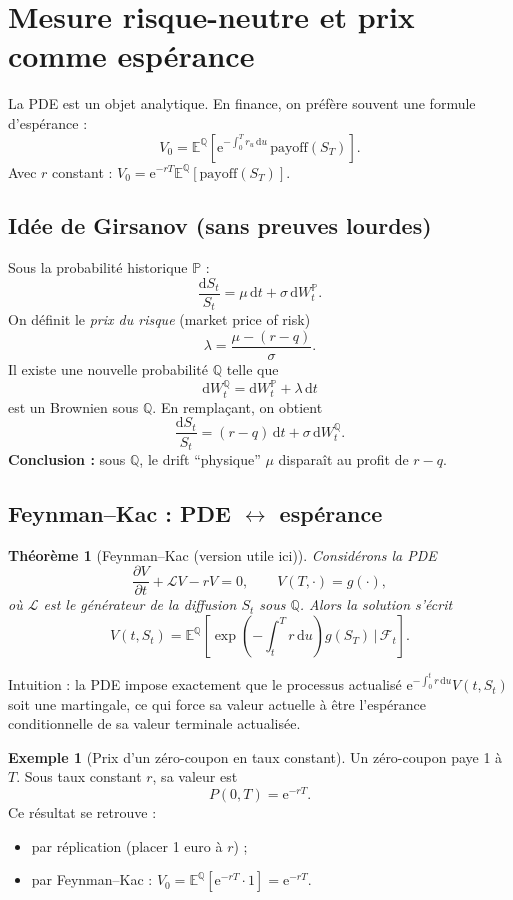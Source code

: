 \documentclass[11pt,a4paper]{report}
\newcommand{\dd}{\mathrm{d}}
\newcommand{\ee}{\mathrm{e}}
\newcommand{\E}{\mathbb{E}}
\newcommand{\Prob}{\mathbb{P}}
\newcommand{\Q}{\mathbb{Q}}
\newcommand{\1}{\mathbbm{1}}
\newcommand{\F}{\mathcal{F}}
\newcommand{\pd}[2]{\frac{\partial #1}{\partial #2}}
\theoremstyle{definition}
\newtheorem{example}{Exemple}[chapter]
\theoremstyle{plain}
\newtheorem{theorem}{Théorème}[chapter]
\theoremstyle{remark}
\begin{document}
\section{Mesure risque-neutre et prix comme espérance}
\label{sec:rn_expectation}

La PDE est un objet analytique. En finance, on préfère souvent une formule d'espérance :
\[
V_0 = \E^{\Q}\left[\ee^{-\int_0^T r_u\,\dd u}\,\text{payoff}(S_T)\right].
\]
Avec $r$ constant : $V_0=\ee^{-rT}\E^{\Q}[\text{payoff}(S_T)]$.

\subsection{Idée de Girsanov (sans preuves lourdes)}
Sous la probabilité historique $\Prob$ :
\[
\frac{\dd S_t}{S_t} = \mu\,\dd t + \sigma\,\dd W_t^{\Prob}.
\]
On définit le \emph{prix du risque} (market price of risk)
\[
\lambda = \frac{\mu-(r-q)}{\sigma}.
\]
Il existe une nouvelle probabilité $\Q$ telle que
\[
\dd W_t^{\Q} = \dd W_t^{\Prob} + \lambda\,\dd t
\]
est un Brownien sous $\Q$.
En remplaçant, on obtient
\[
\frac{\dd S_t}{S_t} = (r-q)\,\dd t + \sigma\,\dd W_t^{\Q}.
\]
\textbf{Conclusion :} sous $\Q$, le drift ``physique'' $\mu$ disparaît au profit de $r-q$.

\subsection{Feynman--Kac : PDE $\leftrightarrow$ espérance}
\begin{theorem}[Feynman--Kac (version utile ici)]
Considérons la PDE
\[
\pd{V}{t} + \mathcal{L}V - rV = 0,\qquad V(T,\cdot)=g(\cdot),
\]
où $\mathcal{L}$ est le générateur de la diffusion $S_t$ sous $\Q$.
Alors la solution s'écrit
\[
V(t,S_t) = \E^{\Q}\left[\exp\!\left(-\int_t^T r\,\dd u\right) g(S_T)\,\Big|\,\F_t\right].
\]
\end{theorem}

Intuition : la PDE impose exactement que le processus actualisé $\ee^{-\int_0^t r\,\dd u}V(t,S_t)$ soit une martingale,
ce qui force sa valeur actuelle à être l'espérance conditionnelle de sa valeur terminale actualisée.

\begin{example}[Prix d'un zéro-coupon en taux constant]
Un zéro-coupon paye 1 à $T$.
Sous taux constant $r$, sa valeur est
\[
P(0,T)=\ee^{-rT}.
\]
Ce résultat se retrouve :
\begin{itemize}
\item par réplication (placer 1 euro à $r$) ;
\item par Feynman--Kac : $V_0=\E^\Q[\ee^{-rT}\cdot 1]=\ee^{-rT}$.
\end{itemize}
\end{example}
\end{document}
